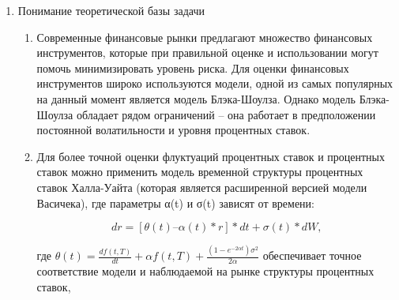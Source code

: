 \documentclass{article}
\begin{document}
\begin{enumerate}
    \item Понимание теоретической базы задачи
    \begin{enumerate}
        \item Современные финансовые рынки предлагают множество финансовых инструментов, которые при правильной оценке и использовании могут помочь минимизировать уровень риска. Для оценки финансовых инструментов широко используются модели, одной из самых популярных на данный момент является модель Блэка-Шоулза. Однако модель Блэка-Шоулза обладает рядом ограничений – она работает в предположении постоянной волатильности и уровня процентных ставок.
        \item Для более точной оценки флуктуаций процентных ставок и процентных ставок можно применить модель временной структуры процентных ставок Халла-Уайта (которая является расширенной версией модели Васичека), где параметры α(t) и σ(t) зависят от времени:
            
            $$dr = [\theta(t) – \alpha(t)*r]*dt + \sigma(t)*dW,$$
            
            где $\theta (t) = \frac{df(t,T)}{dt} + \alpha f(t,T) + \frac{(1- e^{-2\alpha t}) \sigma^2}{2\alpha}$ обеспечивает точное соответствие модели и наблюдаемой на рынке структуры процентных ставок,
            

\end{enumerate}
\end{enumerate}
\end{document}
